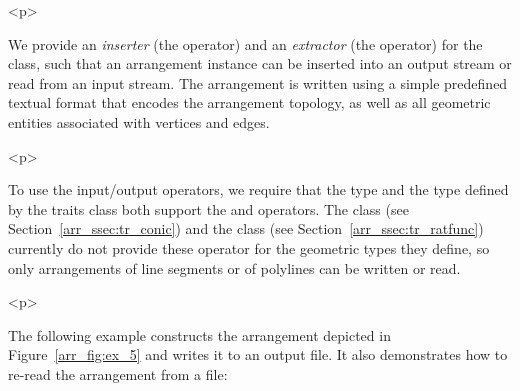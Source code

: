 \begin{ccHtmlOnly}<p>\end{ccHtmlOnly}
We provide an {\em inserter} (the \ccc{<<} operator) and an {\em extractor}
(the \ccc{>>} operator) for the  class,
such that an arrangement instance can be inserted into an output stream
or read from an input stream. The arrangement is written using a simple
predefined textual format that encodes the arrangement topology, as
well as all geometric entities associated with vertices and edges.

\begin{ccHtmlOnly}<p>\end{ccHtmlOnly}
To use the input/output operators, we require that the  type
and the  type defined by the traits class both
support the \ccc{<<} and\ccc{>>} operators. The 
class (see Section~\ref{arr_ssec:tr_conic}) and the 
 class (see Section~\ref{arr_ssec:tr_ratfunc})
currently do not provide these operator for the geometric types
they define, so only arrangements of line segments or of polylines can
be written or read.

\begin{ccHtmlOnly}<p>\end{ccHtmlOnly}
The following example constructs the arrangement depicted in 
Figure~\ref{arr_fig:ex_5} and writes it to an output file. It also
demonstrates how to re-read the arrangement from a file:


